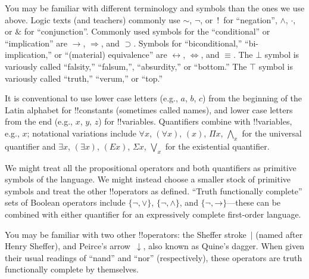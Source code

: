 \documentclass[10pt,a4paper]{article}
\makeatletter
\theoremstyle{plain}
\theoremstyle{definition}
\theoremstyle{remark}
\newenvironment{explain}{}{}
\providecommand{\lif}{\mathbin{\rightarrow}}
\providecommand{\ltrue}{\top}
\providecommand{\lfalse}{\bot}
\providecommand{\iftag}[1]{#1}
\providecommand{\iftag}{}
\def\iftag#1#2#3{\iftag@stop{#2}\iftag@more}
\def\iftag@more{\@ifnextchar\bgroup{\iftag@eat}{\relax}}
\def\iftag@eat#1{}
\def\iftag@stop#1{#1}
\makeatother
\begin{document}
\begin{intro}
You may be familiar with different terminology and symbols than the
ones we use above. Logic texts (and teachers) commonly use 
$\sim$, $\neg$, or~!\ for ``negation'', $\wedge$, $\cdot$, or $\&$
for ``conjunction''.  Commonly used symbols for the ``conditional'' or
``implication'' are $\rightarrow$, $\Rightarrow$, and $\supset$.
\iftag{prvIff,defIff}{Symbols for ``biconditional,'' ``bi-implication,''
  or ``(material) equivalence'' are $\leftrightarrow$,
  $\Leftrightarrow$, and $\equiv$.}{}
\iftag{prvFalse,defFalse}{The $\lfalse$ symbol is variously called
  ``falsity,'' ``falsum,'', ``absurdity,'' or ``bottom.''}{}
\iftag{prvTrue,defTrue}{The $\ltrue$ symbol is variously called
  ``truth,'' ``verum,'' or ``top.''}{}

It is conventional to use lower case letters (e.g., $a$, $b$, $c$) from
the beginning of the Latin alphabet for !!{constant}s (sometimes called
names), and lower case letters from the end (e.g., $x$, $y$, $z$) for
!!{variable}s. Quantifiers combine with !!{variable}s, e.g., $x$;
notational variations include $\forall x$, $(\forall x)$, $(x)$, $\Pi x$,
$\bigwedge_x$ for the universal quantifier and $\exists x$, $(\exists
x)$, $(Ex)$, $\Sigma x$, $\bigvee_x$ for the existential quantifier.
\end{intro}

\begin{explain}
We might treat all the propositional operators and both quantifiers as
primitive symbols of the language.  We might instead choose a smaller
stock of primitive symbols and treat the other !!{operator}s as
defined. ``Truth functionally complete'' sets of Boolean operators
include $\{ \lnot, \lor \}$, $\{ \lnot, \land \}$, and $\{ \lnot,
\lif\}$---these can be combined with either quantifier for an
expressively complete first-order language.

You may be familiar with two other !!{operator}s: the Sheffer
stroke~$|$ (named after Henry Sheffer), and Peirce's
arrow~$\downarrow$, also known as Quine's dagger.  When given their
usual readings of ``nand'' and ``nor'' (respectively), these operators
are truth functionally complete by themselves.
\end{explain}


\end{document}
